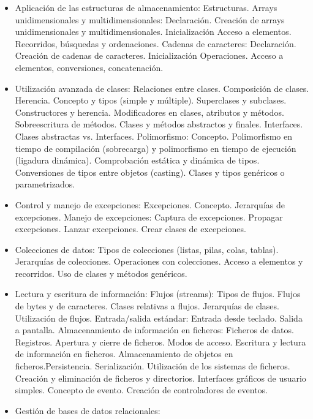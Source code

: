 \begin{itemize}[itemsep=0.1em, topsep=0.1em]
\item Aplicación de las estructuras de almacenamiento:
\subitem Estructuras.
\subitem Arrays unidimensionales y multidimensionales:  Declaración.  Creación de arrays unidimensionales y multidimensionales.  Inicialización  Acceso a elementos.  Recorridos, búsquedas y ordenaciones.
\subitem Cadenas de caracteres: Declaración.  Creación de cadenas de caracteres.  Inicialización Operaciones. Acceso a elementos, conversiones, concatenación.
\item Utilización avanzada de clases:
\subitem Relaciones entre clases. Composición de clases.
\subitem Herencia. Concepto y tipos (simple y múltiple).
\subitem Superclases y subclases.
\subitem Constructores y herencia.
\subitem Modificadores en clases, atributos y métodos.
\subitem Sobreescritura de métodos.
\subitem Clases y métodos abstractos y finales.
\subitem Interfaces. Clases abstractas vs. Interfaces.
\subitem Polimorfismo: Concepto.  Polimorfismo en tiempo de compilación (sobrecarga) y polimorfismo en tiempo de ejecución (ligadura dinámica).  Comprobación estática y dinámica de tipos.
\subitem Conversiones de tipos entre objetos (casting).
\subitem Clases y tipos genéricos o parametrizados.
\item Control y manejo de excepciones:
\subitem Excepciones. Concepto.
\subitem Jerarquías de excepciones.
\subitem Manejo de excepciones:  Captura de excepciones.  Propagar excepciones.  Lanzar excepciones.  Crear clases de excepciones.
\item Colecciones de datos:
\subitem Tipos de colecciones (listas, pilas, colas, tablas).
\subitem Jerarquías de colecciones.
\subitem Operaciones con colecciones. Acceso a elementos y recorridos.
\subitem Uso de clases y métodos genéricos.
\item Lectura y escritura de información:
\subitem Flujos (streams): Tipos de flujos. Flujos de bytes y de caracteres. Clases relativas a flujos. Jerarquías de clases. Utilización de flujos.
\subitem Entrada/salida estándar: Entrada desde teclado. Salida a pantalla.
\subitem Almacenamiento de información en ficheros: Ficheros de datos. Registros. Apertura y cierre de ficheros. Modos de acceso. Escritura y lectura de información en ficheros. Almacenamiento de objetos en ficheros.Persistencia. Serialización. Utilización de los sistemas de ficheros. Creación y eliminación de ficheros y directorios.
\subitem Interfaces gráficos de usuario simples. Concepto de evento. Creación de controladores de eventos.
\item Gestión de bases de datos relacionales:

\end{itemize}
